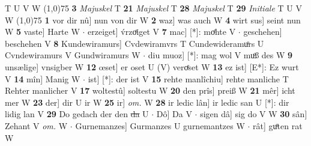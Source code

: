 \documentclass[8pt,a4paper,notitlepage]{article}
\begin{document}
\begin{table}[ht]
\begin{minipage}[t]{0.5\linewidth}
T U V W \newline
\line(1,0){75} \newline
\textbf{3} \textit{Majuskel} T  \textbf{21} \textit{Majuskel} T  \textbf{28} \textit{Majuskel} T  \textbf{29} \textit{Initiale} T U V W  \newline
\line(1,0){75} \newline
\textbf{1} vor dir nû] nun von dir W \textbf{2} waz] was auch W \textbf{4} wirt sus] seint nun W \textbf{5} vaste] Harte W  $\cdot$ erzeiget] v́rzoͤiget V \textbf{7} mac] [*]: moͤhte V  $\cdot$ geschehen] beschehen V \textbf{8} Kundewiramurs] Cvdewiramvrs T Cundewideramuͦrs U Cvndewiramurs V Gundwiramurs W  $\cdot$ diu muoz] [*]: mag wol V muͦß des W \textbf{9} unsælige] vnsigber W \textbf{12} œset] er oset U (V) veroͤset W \textbf{13} ez ist] [E*]: Ez wurt V \textbf{14} mîn] Manig W  $\cdot$ ist] [*]: der ist V \textbf{15} rehte manlîchiu] rehte manliche T Rehter manlicher V \textbf{17} woltestû] soltestu W \textbf{20} den prîs] preiß W \textbf{21} mêr] icht mer W \textbf{23} der] dir U ir W \textbf{25} ir] \textit{om.} W \textbf{28} ir ledic lân] ir ledic san U [*]: dir lidig lan V \textbf{29} Do gedach der den \sout{da} U  $\cdot$ Dô] Da V  $\cdot$ sigen dâ] sig do V W \textbf{30} sân] Zehant V \textit{om.} W  $\cdot$ Gurnemanzes] Gurmanzes U gurnemantzes W  $\cdot$ rât] guͦten rat W \newline
\end{minipage}
\end{table}
\end{document}
